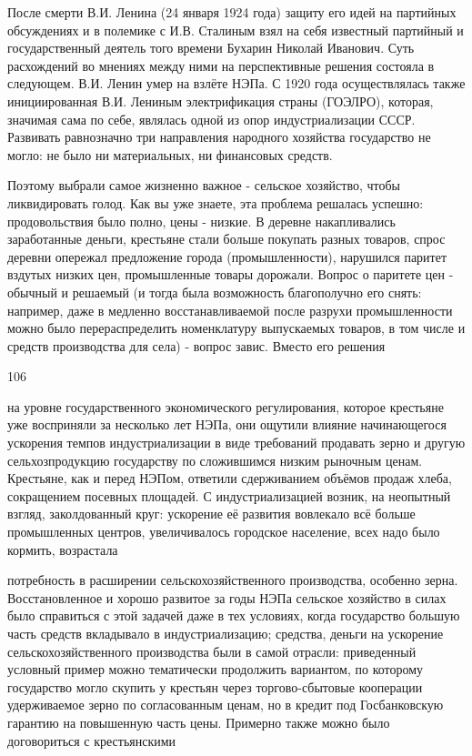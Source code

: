 \label{104-1}
После смерти В.И. Ленина (24 января 1924 года) защиту его идей на партийных обсуждениях и в полемике с И.В. Сталиным взял на себя известный партийный и государственный деятель того времени Бухарин Николай Иванович. Суть расхождений во мнениях между ними на перспективные решения состояла в следующем. В.И. Ленин умер на взлёте НЭПа. С 1920 года осуществлялась также инициированная В.И. Лениным электрификация страны (ГОЭЛРО), которая, значимая сама по себе, являлась одной из опор индустриализации СССР. Развивать равнозначно три направления народного хозяйства государство не могло: не было ни материальных, ни финансовых средств.

\label{105-1}
Поэтому выбрали самое жизненно важное - сельское хозяйство, чтобы ликвидировать голод. Как вы уже знаете, эта проблема решалась успешно: продовольствия было полно, цены - низкие. В деревне накапливались заработанные деньги, крестьяне стали больше покупать разных товаров, спрос деревни опережал предложение города (промышленности), нарушился паритет вздутых низких цен, промышленные товары дорожали. Вопрос о паритете цен - обычный и решаемый (и тогда была возможность благополучно его снять: например, даже в медленно восстанавливаемой после разрухи промышленности можно было перераспределить номенклатуру выпускаемых товаров, в том числе и средств производства для села) - вопрос завис. Вместо его решения

\label{106-1}
106

на уровне государственного экономического регулирования, которое крестьяне уже восприняли за несколько лет НЭПа, они ощутили влияние начинающегося ускорения темпов индустриализации в виде требований продавать зерно и другую сельхозпродукцию государству по сложившимся низким рыночным ценам. Крестьяне, как и перед НЭПом, ответили сдерживанием объёмов продаж хлеба, сокращением посевных площадей. С индустриализацией возник, на неопытный взгляд, заколдованный круг: ускорение её развития вовлекало всё больше промышленных центров, увеличивалось городское население, всех надо было кормить, возрастала

\label{107-1}
потребность в расширении сельскохозяйственного производства, особенно зерна. Восстановленное и хорошо развитое за годы НЭПа сельское хозяйство в силах было справиться с этой задачей даже в тех условиях, когда государство большую часть средств вкладывало в индустриализацию; средства, деньги на ускорение сельскохозяйственного производства были в самой отрасли: приведенный условный пример можно тематически продолжить вариантом, по которому государство могло скупить у крестьян через торгово-сбытовые кооперации удерживаемое зерно по согласованным ценам, но в кредит под Госбанковскую гарантию на повышенную часть цены. Примерно также можно было договориться с крестьянскими 

